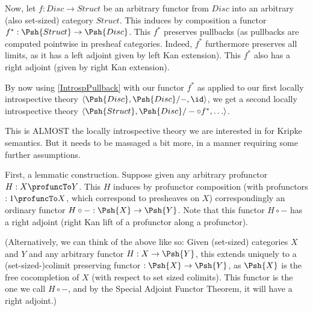 Now, let $f : Disc \to Struct$ be an arbitrary functor from $Disc$ into an arbitrary (also set-sized) category $Struct$. This induces by composition a functor $f^* : \Psh{Struct} \to \Psh{Disc}$. This $f^*$ preserves pullbacks (as pullbacks are computed pointwise in presheaf categories. Indeed, $f^*$ furthermore preserves all limits, as it has a left adjoint given by left Kan extension). This $f^*$ also has a right adjoint (given by right Kan extension).


By now using \cref{IntrospPullback} with our functor $f^*$ as applied to our first locally introspective theory $\langle \Psh{Disc}, \Psh{Disc}/-, \id \rangle$, we get a second locally introspective theory $\langle \Psh{Struct}, \Psh{Disc}/- \circ f^*, \ldots \rangle$.

This is ALMOST the locally introspective theory we are interested in for Kripke semantics. But it needs to be massaged a bit more, in a manner requiring some further assumptions. 

First, a lemmatic construction. Suppose given any arbitrary profunctor $H : X \profuncTo Y$. This $H$ induces by profunctor composition (with profunctors $:1 \profuncTo X$, which correspond to presheaves on $X$) correspondingly an ordinary functor $H \circ - : \Psh{X} \to \Psh{Y}$. Note that this functor $H \circ -$ has a right adjoint (right Kan lift of a profunctor along a profunctor).

(Alternatively, we can think of the above like so: Given (set-sized) categories $X$ and $Y$ and any arbitrary functor $H : X \to \Psh{Y}$, this extends uniquely to a (set-sized-)colimit preserving functor $: \Psh{X} \to \Psh{Y}$, as $\Psh{X}$ is the free cocompletion of $X$ (with respect to set sized colimits). This functor is the one we call $H \circ -$, and by the Special Adjoint Functor Theorem, it will have a right adjoint.)


